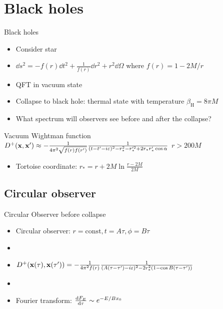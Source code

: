 \documentclass{beamer}
\newcommand{\ind}[1]{_\mathrm{#1}}
\begin{document}
\section{Black holes}
\begin{frame}{Black holes}
\begin{itemize}
	\item Consider star
	\item \(\dd s^2 = -f(r)\dd{t^2} + \frac{1}{f(r)}\dd{r^2} + r^2 \dd{\Omega}\) where \(f(r) = 1 - 2M/r\)
	\item QFT in vacuum state
	\item Collapse to black hole: thermal state with temperature \(\beta\ind{H} = 8\pi M\)\cite{hawking}
	\item What spectrum will observers see before and after the collapse?
\end{itemize}
\begin{block}{Vacuum Wightman function}
	\(D^+(\vb{x}, \vb{x}') \approx -\frac{1}{4\pi^2 \sqrt{f(r)f(r')}} \frac{1}{(t-t'-i\varepsilon)^2 - r_*^2 - r_*'^2 + 2r_*r_*' \cos{\alpha}}\) \hspace{1cm} \(r > 200M\)
\end{block}
\begin{itemize}
	\item Tortoise coordinate: \(r_* = r + 2M \ln \frac{r-2M}{2M}\)
\end{itemize}
\end{frame}


\subsection{Circular observer}

\begin{frame}{Circular Observer before collapse}
\begin{itemize}
	\item Circular observer: \(r = \mathrm{const}, t = A\tau, \phi = B \tau\)
	\item[]
	\item \(D^+(\vb{x}(\tau), \vb{x}(\tau')) = -\frac{1}{4\pi^2f(r)} \frac{1}{(A(\tau-\tau')-i\varepsilon)^2 - 2r_*^2 (1 - \cos{B(\tau-\tau')})}\)
	\item[]
	\item Fourier transform: \(\dv{F_E}{\tau} \sim e^{-E/B x_0}\)
\end{itemize}
\end{frame}
\end{document}
